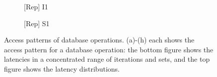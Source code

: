 \begin{figure}[t]
\begin{subfigure}[b]{.12\textwidth}
        \centering
        \caption{[Rep] I1}
        \label{fig:12:rep:side-channel-feature-i1}
    \end{subfigure}
    \hfill
    \begin{subfigure}[b]{.12\linewidth}
        \centering
        \caption{[Rep] S1}
        \label{fig:12:rep:side-channel-feature-s1}
    \end{subfigure}

    \caption{Access patterns of database operations. (a)-(h) each shows the access pattern for a database operation: the bottom figure shows the latencies in a concentrated range of iterations and sets, and the top figure shows the latency distributions.}
    \label{fig:12:side-channel-feature}

\end{figure}

